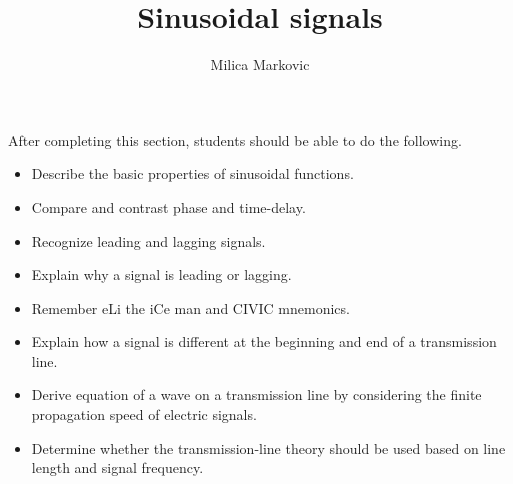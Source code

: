 \documentclass{ximera}
\title{Sinusoidal signals}
\author{Milica Markovic}
\begin{document}
\begin{abstract}
\end{abstract}

\maketitle


\begin{sectionOutcomes}
After completing this section, students should be able to do the following.
\begin{itemize}
\item Describe the basic properties of sinusoidal functions.
\item Compare and contrast phase and time-delay.
\item Recognize leading and lagging signals. 
\item Explain why a signal is leading or lagging.
\item Remember eLi the iCe man and CIVIC mnemonics.
\item Explain how a signal is different at the beginning and end of a transmission line.
\item Derive equation of a wave on a transmission line by considering the finite propagation speed of electric signals.
\item Determine whether the transmission-line theory should be used based on line length and signal frequency.
\end{itemize}
\end{sectionOutcomes}
\end{document}
